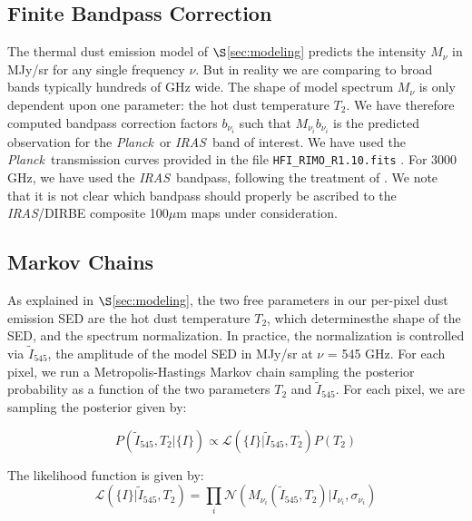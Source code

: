 \documentclass{emulateapj}
\newcommand{\IRAS}{{\it IRAS}}
\newcommand{\PLANCK}{{\it Planck}}
\begin{document}
\subsection{Finite Bandpass Correction}
The thermal dust emission model of $\S$\ref{sec:modeling} predicts the 
intensity $M_{\nu}$ in MJy/sr for any single frequency $\nu$. But in reality
we are comparing to broad bands typically hundreds of GHz wide. The shape of 
model spectrum $M_{\nu}$ is only dependent upon one parameter: the hot
dust temperature $T_2$. We have therefore computed bandpass correction factors
$b_{\nu_i}$ such that $M_{\nu_i}b_{\nu_i}$ is the predicted observation for the
\PLANCK~or \IRAS~band of interest. We have used the \PLANCK~transmission 
curves provided in the file \verb|HFI_RIMO_R1.10.fits| \citep{planckresponse}. 
For 3000 GHz, we have used the \IRAS~bandpass, following the treatment of
\cite{planckdust}. We note that it is not clear which bandpass should
properly be ascribed to the \IRAS/DIRBE composite 100$\mu$m maps under
consideration. %


\subsection{Markov Chains}
As explained in $\S$\ref{sec:modeling}, the two free parameters in our 
per-pixel dust emission SED are the hot dust temperature $T_2$, which 
determinesthe shape of the SED, and the spectrum normalization. In practice,
the normalization is controlled via $\tilde{I}_{545}$, the amplitude of the 
model SED in MJy/sr at $\nu$ = 545 GHz. For each pixel, we run a 
Metropolis-Hastings Markov chain sampling the posterior probability as a 
function of the two parameters $T_2$ and $\tilde{I}_{545}$. For each pixel, we 
are sampling the posterior given by:

\begin{equation}
P(\tilde{I}_{545}, T_2|\{I\}) \propto \mathcal{L}(\{I\}|\tilde{I}_{545}, T_2)P(T_2)
\end{equation}

The likelihood function is given by:
\begin{equation}
\mathcal{L}(\{I\}|\tilde{I}_{545}, T_2) = \displaystyle\prod\limits_{i}\mathcal{N}(M_{\nu_{i}}(\tilde{I}_{545}, T_2)|I_{\nu_{i}}, \sigma_{\nu_i})
\end{equation}
\end{document}
